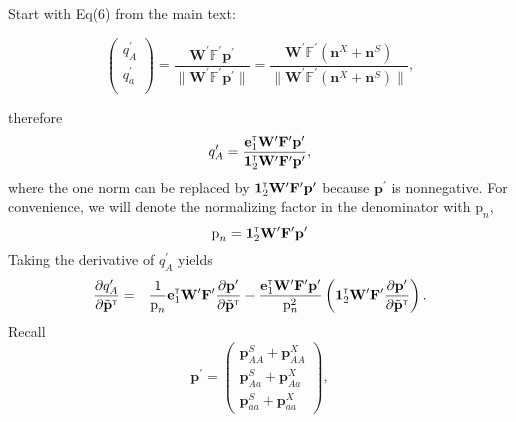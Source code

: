\documentclass[11pt]{article}
\def\mbf#1{\mathbf{#1}}
\def\mbb#1{\mathbb{#1}}
\newcommand{\bo}[1]{{\bf #1}}
\newcommand{\tr}{{\mbox{\tiny \sf T}}}
\begin{document}
 Start with Eq(6) from the main text:
\begin{linenomath*}
\begin{equation} \label{eq:maleGametePool}
	\left(
		\begin{array}{c}
			q^{\prime}_{A} \\
			q^{\prime}_{a} \\
		\end{array} \right) = 
			\frac{\mbf{W}^{\prime} \mbb{F}^{\prime} \mbf{p}^{\prime}}{\| \mbf{W}^{\prime} \mbb{F}^{\prime} \mbf{p}^{\prime} \|} = 
				\frac{\mbf{W}^{\prime} \mbb{F}^{\prime} (\mbf{n}^X + \mbf{n}^S)}{\| \mbf{W}^{\prime} \mbb{F}^{\prime} (\mbf{n}^X + \mbf{n}^S)\|},
\end{equation}
\end{linenomath*}
therefore
\begin{equation}
  q^\prime_A=\frac{\mathbf{e}_1^\tr \mathbf{W}^\prime \mathbf{F}^\prime  \mathbf{p}^\prime}{\mathbf{1}^\tr_{2}\mathbf{W}^\prime\mathbf{F}^\prime\mathbf{p}^\prime}, \label{eq:male_gamete_pool}
\end{equation}
 where the one norm can be replaced by $\mathbf{1}^\tr_{2}\mathbf{W}^\prime\mathbf{F}^\prime \mathbf{p}^\prime$ because $\mathbf{p}^\prime$ is nonnegative. For convenience, we will denote the normalizing factor in the denominator with $ \mbox{p}_{n}$, 
 \begin{equation}
   \mbox{p}_{n}=\mathbf{1}^\tr_{2}\mathbf{W}^\prime\mathbf{F}^\prime \mathbf{p}^\prime
 \end{equation}
 Taking the derivative of $ q^\prime_A$ yields
\begin{eqnarray}
  \frac{\partial   q^\prime_A }{\partial \tilde{\bo p}^\tr}&=& \frac{1}{ \mbox{p}_{n}}\mathbf{e}_1^\tr \mathbf{W}^\prime \mathbf{F}^\prime   \frac{\partial  \mathbf{p}^\prime}{\partial \tilde{\bo p}^\tr} - \frac{\mathbf{e}_1^\tr \mathbf{W}^\prime \mathbf{F}^\prime \mathbf{p}^\prime}{ \mbox{p}_{n}^2} \left( \mathbf{1}^\tr_{2}\mathbf{W}^\prime\mathbf{F}^\prime \frac{\partial  \mathbf{p}^\prime}{\partial \tilde{\bo p}^\tr} \right). \label{eq:56_app}
\end{eqnarray}
Recall 
\begin{equation}
  \mathbf{p}^\prime=\left(\begin{array} {c}
\mathbf{p}^S_{AA}+\mathbf{p}^X_{AA}\\
\mathbf{p}^S_{Aa}+\mathbf{p}^X_{Aa}\\
\mathbf{p}^S_{aa}+\mathbf{p}^X_{aa}
  \end{array}\right),
\end{equation}
\end{document}
